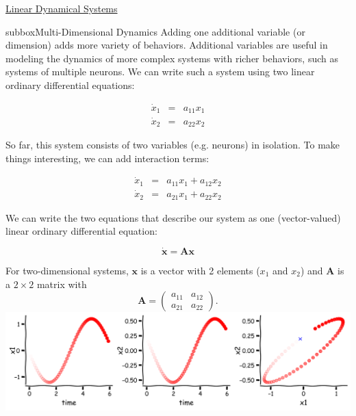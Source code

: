 \begin{textbox}{\href{https://compneuro.neuromatch.io/tutorials/W2D2_LinearSystems/student/W2D2_Tutorial1.html}{Linear Dynamical Systems } }
\begin{subbox}{subbox}{Multi-Dimensional Dynamics}
\scriptsize
Adding one additional variable (or dimension) adds more variety of behaviors. Additional variables are useful in modeling the dynamics of more complex systems with richer behaviors, such as systems of multiple neurons. We can write such a system using two linear ordinary differential equations:

\begin{eqnarray}
  \dot{x}_1 &=& {a}_{11} x_1 \\
  \dot{x}_2 &=& {a}_{22} x_2 
\end{eqnarray}

So far, this system consists of two variables (e.g. neurons) in isolation. To make things interesting, we can add interaction terms:

\begin{eqnarray}
  \dot{x}_1 &=& {a}_{11} x_1 + {a}_{12} x_2 \\
  \dot{x}_2 &=& {a}_{21} x_1 + {a}_{22} x_2 
\end{eqnarray}

We can write the two equations that describe our system as one (vector-valued) linear ordinary differential equation:

$$\dot{\mathbf{x}} = \mathbf{A} \mathbf{x}$$

For two-dimensional systems, $\mathbf{x}$ is a vector with 2 elements ($x_1$ and $x_2$) and $\mathbf{A}$ is a $2 \times 2$ matrix with 
$$\mathbf{A}=
\begin{pmatrix}
 a_{11} & a_{12} \\
 a_{21} & a_{22} 
\end{pmatrix}.
$$
\centering
\includegraphics[scale=0.14]{Figures/LS/LSFigure2.png}

\end{subbox}

\end{textbox}

